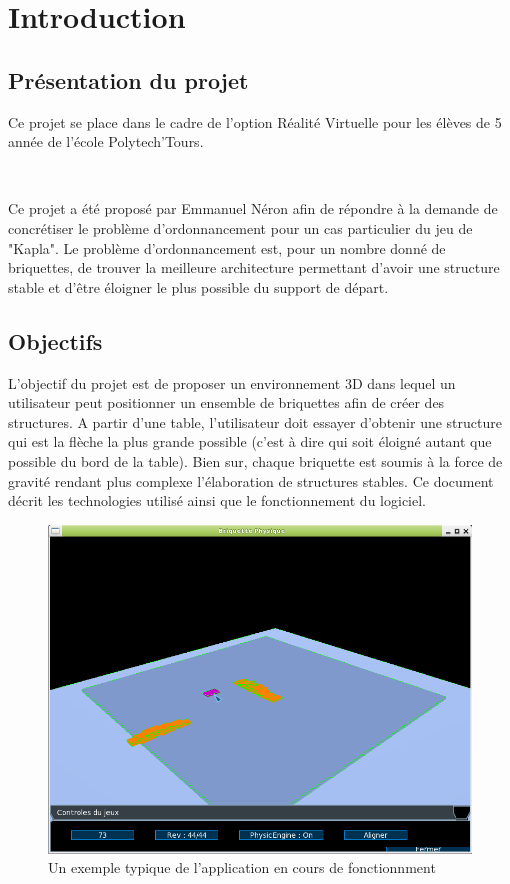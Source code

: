 \documentclass[frenchb,twoside]{EPURapport}
\begin{document}
\chapter{Introduction}

\section{Présentation du projet}

	Ce projet se place dans le cadre de l'option Réalité Virtuelle pour les
	élèves de 5 année de l'école Polytech'Tours.
	
	\
	
	Ce projet a été proposé par Emmanuel Néron afin de répondre à la demande
	de concrétiser le problème d'ordonnancement pour un cas particulier du jeu
	de "Kapla". Le problème d'ordonnancement est, pour un nombre donné de
	briquettes, de trouver la meilleure architecture permettant d'avoir une
	structure stable et d'être éloigner le plus possible du support de départ.

\section{Objectifs}
    L'objectif du projet est de proposer un environnement 3D dans lequel un
    utilisateur peut positionner un ensemble de briquettes afin de créer des
    structures. A partir d'une table, l'utilisateur doit essayer d'obtenir une
    structure qui est la flèche la plus grande possible (c'est à dire qui soit
    éloigné autant que possible du bord de la table).
    Bien sur, chaque briquette est soumis à la force de gravité rendant plus
    complexe l'élaboration de structures stables.
    Ce document décrit les technologies utilisé ainsi que le fonctionnement du
    logiciel.
    
    \begin{figure}[h]
		\centering
        \includegraphics[width=13cm]{images/jeux.png}
        \caption{\label{fig:jeux}Un exemple typique de l'application en cours de fonctionnment}
    \end{figure}
\end{document}
